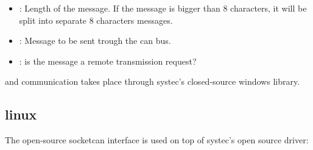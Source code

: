 \documentclass[letterpaper,10pt,english]{sphinxmanual}
\begin{document}
\begin{fulllineitems}
\begin{fulllineitems}
\begin{description}
\begin{itemize}
\item {} 
: Length of the message. If the message is bigger than 8 characters, it will be split into separate 8 characters messages. 

\item {} 
: Message to be sent trough the can bus. 

\item {} 
: is the message a remote transmission request? 

\end{itemize}

\end{description}


\end{fulllineitems}


\end{fulllineitems}


and communication takes place through systec’s closed-source windows library.


\subsection{linux}
\label{\detokenize{vendors/systec:linux}}
The open-source socketcan interface is used on top of systec’s open source driver:
\end{document}
